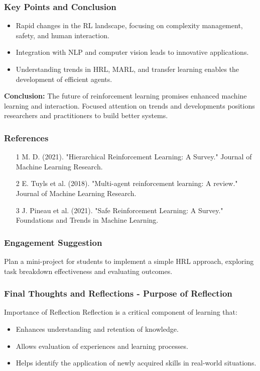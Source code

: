 \documentclass[aspectratio=169]{beamer}
\begin{document}
\begin{frame}[fragile]
    \frametitle{Key Points and Conclusion}
    \begin{itemize}
        \item Rapid changes in the RL landscape, focusing on complexity management, safety, and human interaction.
        
        \item Integration with NLP and computer vision leads to innovative applications.
        
        \item Understanding trends in HRL, MARL, and transfer learning enables the development of efficient agents.
    \end{itemize}
    
    \textbf{Conclusion:} The future of reinforcement learning promises enhanced machine learning and interaction. Focused attention on trends and developments positions researchers and practitioners to build better systems.
\end{frame}

\begin{frame}[fragile]
    \frametitle{References}
    \begin{itemize}
        \item [1] M. D. (2021). "Hierarchical Reinforcement Learning: A Survey." Journal of Machine Learning Research.
        \item [2] E. Tuyls et al. (2018). "Multi-agent reinforcement learning: A review." Journal of Machine Learning Research.
        \item [3] J. Pineau et al. (2021). "Safe Reinforcement Learning: A Survey." Foundations and Trends in Machine Learning.
    \end{itemize}
\end{frame}

\begin{frame}[fragile]
    \frametitle{Engagement Suggestion}
    Plan a mini-project for students to implement a simple HRL approach, exploring task breakdown effectiveness and evaluating outcomes.
\end{frame}

\begin{frame}[fragile]
    \frametitle{Final Thoughts and Reflections - Purpose of Reflection}
    \begin{block}{Importance of Reflection}
        Reflection is a critical component of learning that:
        \begin{itemize}
            \item Enhances understanding and retention of knowledge.
            \item Allows evaluation of experiences and learning processes.
            \item Helps identify the application of newly acquired skills in real-world situations.
        \end{itemize}
    \end{block}
\end{frame}
\end{document}
